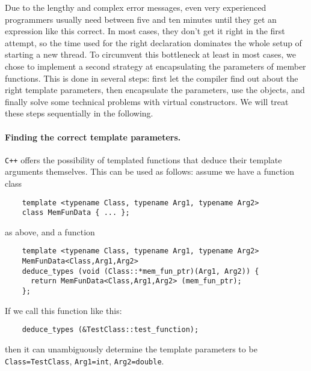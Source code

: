 \documentclass[11pt]{article}
\begin{document}
Due to the lengthy and complex error messages, even very experienced
programmers usually need between five and ten minutes until they get an
expression like this correct. In most cases, they don't get it right in the
first attempt, so the time used for the right declaration dominates the whole
setup of starting a new thread. To circumvent this bottleneck at least in most
cases, we chose to implement a second strategy at encapsulating the parameters
of member functions. This is done in several steps: first let the compiler
find out about the right template parameters, then encapsulate the parameters,
use the objects, and finally solve some technical problems with virtual
constructors. We will treat these steps sequentially in the following.


\paragraph{Finding the correct template parameters.}
\texttt{C++} offers the possibility of templated functions that deduce their
template arguments themselves. This can be used as follows: assume we have a
function class
\begin{verbatim}
    template <typename Class, typename Arg1, typename Arg2>
    class MemFunData { ... };
\end{verbatim}
as above, and a function
\begin{verbatim}
    template <typename Class, typename Arg1, typename Arg2>
    MemFunData<Class,Arg1,Arg2>
    deduce_types (void (Class::*mem_fun_ptr)(Arg1, Arg2)) {
      return MemFunData<Class,Arg1,Arg2> (mem_fun_ptr);
    };
\end{verbatim}
If we call this function like this:
\begin{verbatim}
    deduce_types (&TestClass::test_function);
\end{verbatim}
then it can unambiguously determine the template parameters to be
\texttt{Class=TestClass}, \texttt{Arg1=int}, \texttt{Arg2=double}. 
\end{document}
